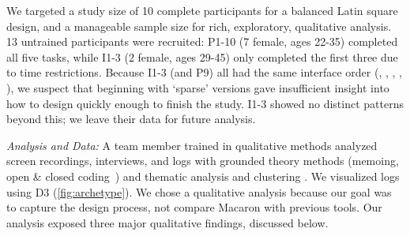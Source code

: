 %
%

We targeted a study size of 10 complete participants for a balanced Latin square design, and a manageable sample size for rich, exploratory, qualitative analysis. %
13 untrained  participants were recruited: P1-10  (7 female, ages 22-35) completed all five tasks, while I1-3 (2 female, ages 29-45) 
only completed the first three %
due to time restrictions.
Because I1-3 (and P9) all had the same interface order (\lo, \none, \vis, \hi, \select), we suspect that beginning with `sparse' versions gave insufficient insight into how to design quickly enough to finish the study. %
I1-3 showed no distinct patterns beyond this; we leave their data for future analysis.  
 
%



\emph{Analysis and Data:} A team member %
trained in qualitative methods analyzed screen recordings, interviews, and logs with grounded theory methods (memoing, open \& closed coding~\cite{Corbin2008}) and thematic analysis and clustering \cite{Moustakas1994}.
We visualized logs using D3 (\autoref{fig:archetype}). 
%
We chose a qualitative analysis because our goal was to capture the design process, not compare Macaron with previous tools.
Our analysis exposed three major qualitative findings, discussed below.

